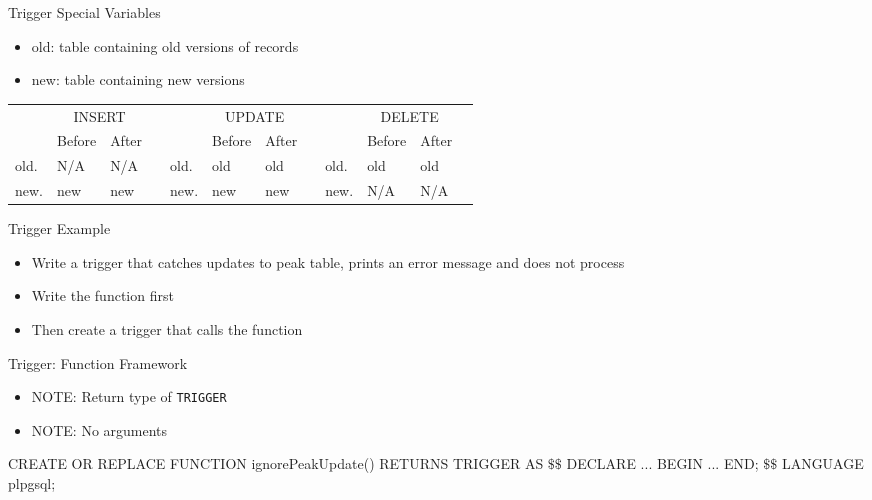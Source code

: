 \documentclass[aspectratio=169]{beamer}
\newenvironment{noindentitemize}
{ \begin{itemize}
 \setlength{\itemsep}{1.5ex}
  \setlength{\parsep}{0pt}   
  \setlength{\parskip}{0pt}
 \addtolength{\leftskip}{-2em}
 }
{ \end{itemize} }
\begin{document}
\begin{frame}{Trigger Special Variables}

\begin{noindentitemize}
	\item old: table containing old versions of records
	\item new: table containing new versions
\end{noindentitemize}

\footnotesize{
\begin{tabular}{|l|l|l|c|l|l|l|c|l|l|l|c|}
    \cline{1-3}  \cline{5-7} \cline{9-11}
    & \multicolumn{2}{c|}{INSERT} & & & \multicolumn{2}{|c|}{UPDATE} & & & \multicolumn{2}{|c|}{DELETE} \\ \cline{2-3}  \cline{6-7} \cline{10-11}
    & Before& After & & & Before& After &  & & Before& After  \\  \cline{1-3} \cline{5-7} \cline{9-11}
    old. & N/A & N/A & & old. & old & old & & old. & old & old\\ \cline{2-3} \cline{5-7} \cline{9-11}
    new. & new & new & & new. & new & new  & & new. & N/A & N/A \\ \cline{2-3} \cline{5-7} \cline{9-11}
    \cline{1-3}  \cline{5-7} \cline{9-11}
\end{tabular}
}
\end{frame}


\begin{frame}[fragile]{Trigger Example}

\begin{noindentitemize}
	\item Write a trigger that catches updates to peak table, prints an error message and does not process
	\item Write the function first
	\item Then create a trigger that calls the function
\end{noindentitemize}


\end{frame}

\begin{frame}[fragile]{Trigger: Function Framework}

\begin{noindentitemize}
	\item NOTE: Return type of \texttt{TRIGGER}
	\item NOTE: No arguments
\end{noindentitemize}


\begin{SQL}
CREATE OR REPLACE FUNCTION  
   ignorePeakUpdate() RETURNS TRIGGER AS
$\textbf{\$\$}$
DECLARE 
	...
BEGIN
	...
END;
$\textbf{\$\$}$
LANGUAGE plpgsql;
\end{SQL}
\end{frame}
\end{document}

